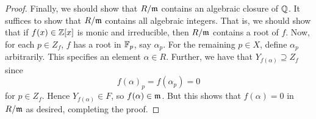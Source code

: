 \documentclass[12pt]{exam}
\begin{document}
\begin{proof}
	Finally, we should show that $R/\mathfrak{m}$ contains an algebraic closure of $\mathbb{Q}$. It suffices to show that $R/\mathfrak{m}$ contains all algebraic integers. That is, we should show that if $f(x) \in \mathbb{Z}[x]$ is monic and irreducible, then $R/\mathfrak{m}$ contains a root of $f$. Now, for each $p \in Z_f$, $f$ has a root in $\mathbb{F}_p$, say $\alpha_p$. For the remaining $p \in X$, define $\alpha_p$ arbitrarily. This specifies an element $\alpha \in R$. Further, we have that $Y_{f(\alpha)} \supseteq Z_f$ since
	\[ f(\alpha)_p = f(\alpha_p) = 0 \]
	for $p \in Z_f$. Hence $Y_{f(\alpha)} \in F$, so $f(\alpha) \in \mathfrak{m}$. But this shows that $f(\alpha) = 0$ in $R/\mathfrak{m}$ as desired, completing the proof.
\end{proof}
\end{document}
